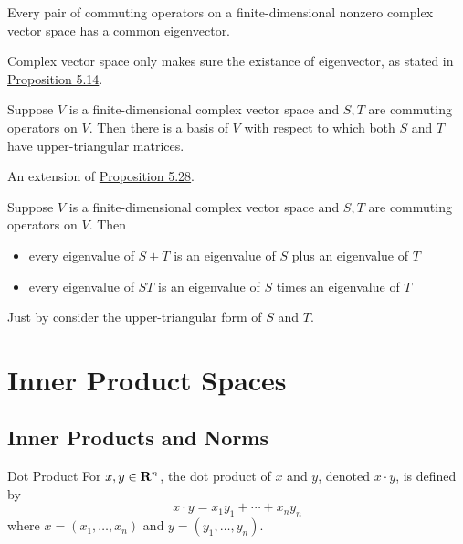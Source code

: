 \documentclass[12pt,a4paper]{article}
\begin{document}
    \begin{prop}
        Every pair of commuting operators on a finite-dimensional nonzero complex vector space has a common eigenvector.
    \end{prop}
    \begin{remark}
        Complex vector space only makes sure the existance of eigenvector, as stated in \hyperref[5.14]{Proposition 5.14}.
    \end{remark}
    \hfill

    \begin{prop}
        Suppose $V$ is a finite-dimensional complex vector space and $S,T$ are commuting operators on $V$. Then there is a basis of $V$ with respect to which both $S$ and $T$ have upper-triangular matrices.
    \end{prop}
    \begin{remark}
        An extension of \hyperref[5.28]{Proposition 5.28}.
    \end{remark}
    \hfill

    \begin{prop}
        Suppose $V$ is a finite-dimensional complex vector space and $S,T$ are commuting operators on $V$. Then
        \begin{itemize}
            \item every eigenvalue of $S+T$ is an eigenvalue of $S$ plus an eigenvalue of $T$
            \item every eigenvalue of $ST$ is an eigenvalue of $S$ times an eigenvalue of $T$
        \end{itemize}
    \end{prop}
    \begin{remark}
        Just by consider the upper-triangular form of $S$ and $T$.
    \end{remark}
    \hfill
        
    \section{Inner Product Spaces}%
    \subsection{Inner Products and Norms}
    \begin{defi}{Dot Product}
        For $x,y\in\mathbf{R}^n$, the dot product of $x$ and $y$, denoted $x\cdot y$, is defined by
        $$
        x\cdot y=x_1y_1+\cdots+x_ny_n
        $$
        where $x=(x_1,\dots,x_n)$ and $y=(y_1,\dots,y_n)$.
    \end{defi}
    \hfill
\end{document}
